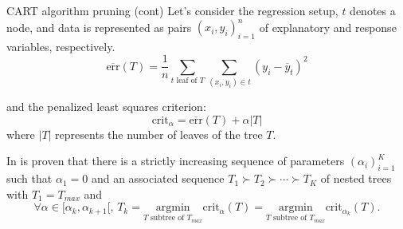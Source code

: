 \documentclass{beamer}
\begin{document}
\begin{frame}{CART algorithm pruning (cont)}
Let's consider the regression setup, $t$ denotes a node, and data is represented as pairs $(x_i,y_i)_{i=1}^n$ of explanatory and response variables, respectively.  
\begin{equation*}
\overline{\text{err}}(T)= \frac{1}{n}\sum_{t \text{ leaf of } T} \sum_{(x_i,y_i) \in t} (y_i- \overline{y}_t)^2
\end{equation*}

and the penalized least squares criterion:
\begin{equation*}
	\text{crit}_\alpha= \overline{\text{err}}(T) + \alpha |T|
\end{equation*}
where $|T|$ represents the number of leaves of the tree $T$. 

In \citep{cartbook} is proven that there is a strictly increasing sequence of parameters $(\alpha_i)_{i=1}^K$ such that $\alpha_1=0$ and an associated sequence $T_1 \succ T_2 \succ \cdots \succ T_K$ of nested trees with $T_1=T_{max}$ and 
\begin{equation*}
	\forall \alpha \in [\alpha_k, \alpha_{k+1}[ , \, T_k= \underset{ T \text{ subtree of }T_{max}  }{\textrm{argmin}}
	 \text{crit}_{\alpha} (T) = \underset{ T \text{ subtree of }T_{max}  }{\textrm{argmin}}
	 \text{crit}_{\alpha_k} (T). 
\end{equation*}
\end{frame}
\end{document}

